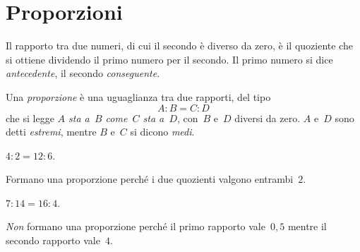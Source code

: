 \ovalbox{\risolvii \ref{ese:3.86}, \ref{ese:3.87}, \ref{ese:3.88}, \ref{ese:3.89}, \ref{ese:3.90},
\ref{ese:3.91}, \ref{ese:3.92}, \ref{ese:3.93}, \ref{ese:3.94}, \ref{ese:3.95}, \ref{ese:3.96},
\ref{ese:3.97}, \ref{ese:3.98},}

\vspazio\ovalbox{\ref{ese:3.99}, \ref{ese:3.100}, \ref{ese:3.101}, \ref{ese:3.102}, \ref{ese:3.103}, \ref{ese:3.104},
\ref{ese:3.105}, \ref{ese:3.106}, \ref{ese:3.107}, \ref{ese:3.108}, \ref{ese:3.109}, \ref{ese:3.110}, \ref{ese:3.111},
\ref{ese:3.112},}

\vspazio\ovalbox{\ref{ese:3.113}, \ref{ese:3.114}, \ref{ese:3.115}, \ref{ese:3.116}, \ref{ese:3.117}}

\section{Proporzioni}

\begin{definizione}
 Il rapporto tra due numeri, di cui il secondo è diverso da zero, è il quoziente che si ottiene dividendo
il primo numero per il secondo. Il primo numero si dice \emph{antecedente}, il secondo \emph{conseguente}.
\end{definizione}

\begin{center}
  
\end{center}

\begin{definizione}
 Una \emph{proporzione} è una uguaglianza tra due rapporti, del tipo
\[A: B = C: D\]
che si legge \emph{$A$ sta a~$B$ come~$C$ sta a~$D$}, con~$B$ e~$D$ diversi da zero. $A$ e~$D$ sono detti \emph{estremi}, mentre $B$ e~$C$ si dicono \emph{medi}.
\end{definizione}

\begin{center}
  
\end{center}

\begin{exrig}
 \begin{esempio}
  $4:2=12:6$.

Formano una proporzione perché i due quozienti valgono entrambi~$2$.
 \end{esempio}

\begin{esempio}
$7:14=16:4$.

 \emph{Non} formano una proporzione perché il primo rapporto vale~$0,5$ mentre il secondo rapporto vale~$4$.
\end{esempio}
\end{exrig}

